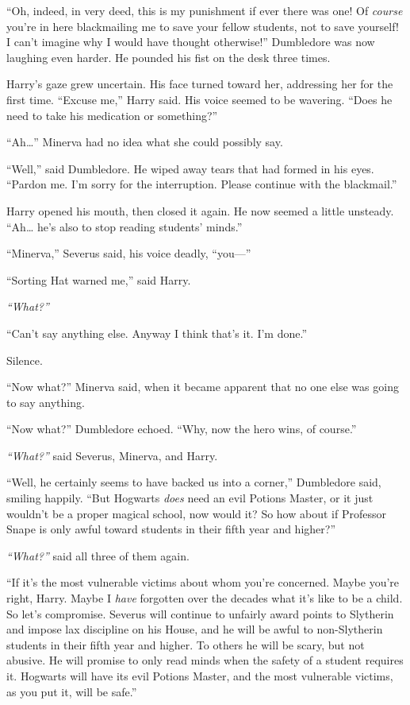 ``Oh, indeed, in very deed, this is my punishment if ever there was one!
Of \emph{course} you're in here blackmailing me to save your fellow
students, not to save yourself! I can't imagine why I would have thought
otherwise!'' Dumbledore was now laughing even harder. He pounded his
fist on the desk three times.

Harry's gaze grew uncertain. His face turned toward her, addressing her
for the first time. ``Excuse me,'' Harry said. His voice seemed to be
wavering. ``Does he need to take his medication or something?''

``Ah\ldots{}'' Minerva had no idea what she could possibly say.

``Well,'' said Dumbledore. He wiped away tears that had formed in his
eyes. ``Pardon me. I'm sorry for the interruption. Please continue with
the blackmail.''

Harry opened his mouth, then closed it again. He now seemed a little
unsteady. ``Ah\ldots{} he's also to stop reading students' minds.''

``Minerva,'' Severus said, his voice deadly, ``you---''

``Sorting Hat warned me,'' said Harry.

\emph{``What?''}

``Can't say anything else. Anyway I think that's it. I'm done.''

Silence.

``Now what?'' Minerva said, when it became apparent that no one else was
going to say anything.

``Now what?'' Dumbledore echoed. ``Why, now the hero wins, of course.''

\emph{``What?''} said Severus, Minerva, and Harry.

``Well, he certainly seems to have backed us into a corner,'' Dumbledore
said, smiling happily. ``But Hogwarts \emph{does} need an evil Potions
Master, or it just wouldn't be a proper magical school, now would it? So
how about if Professor Snape is only awful toward students in their
fifth year and higher?''

\emph{``What?''} said all three of them again.

``If it's the most vulnerable victims about whom you're concerned. Maybe
you're right, Harry. Maybe I \emph{have} forgotten over the decades what
it's like to be a child. So let's compromise. Severus will continue to
unfairly award points to Slytherin and impose lax discipline on his
House, and he will be awful to non-Slytherin students in their fifth
year and higher. To others he will be scary, but not abusive. He will
promise to only read minds when the safety of a student requires it.
Hogwarts will have its evil Potions Master, and the most vulnerable
victims, as you put it, will be safe.''

